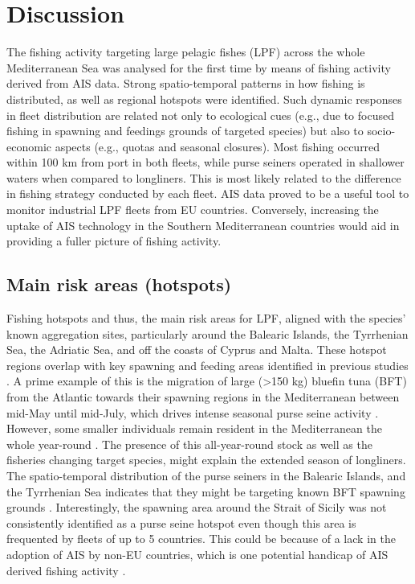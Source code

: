 \chapter{Discussion}
The fishing activity targeting large pelagic fishes (LPF) across the whole Mediterranean Sea was
analysed for the first time by means of fishing activity derived from AIS data. Strong
spatio-temporal patterns in how fishing is distributed, as well as regional hotspots were
identified. Such dynamic responses in fleet distribution are related not only to ecological cues
(e.g., due to focused fishing in spawning and feedings grounds of targeted species) but also to
socio-economic aspects (e.g., quotas and seasonal closures). Most fishing occurred within 100 km
from port in both fleets, while purse seiners operated in shallower waters when compared to
longliners. This is most likely related to the difference in fishing strategy conducted by each
fleet. AIS data proved to be a useful tool to monitor industrial LPF fleets from EU countries.
Conversely, increasing the uptake of AIS technology in the Southern Mediterranean countries would
aid in providing a fuller picture of fishing activity.

\section{Main risk areas (hotspots)}
Fishing hotspots and thus, the main risk areas for LPF, aligned with the species' known aggregation
sites, particularly around the Balearic Islands, the Tyrrhenian Sea, the Adriatic Sea, and off the
coasts of Cyprus and Malta. These hotspot regions overlap with key spawning and feeding areas
identified in previous studies \citep{medina_spawning,arocha_2007}. A prime example of this is the
migration of large (>150 kg) bluefin tuna (BFT) from the Atlantic towards their spawning regions in
the Mediterranean between mid-May until mid-July, which drives intense seasonal purse seine
activity \citep{bft_mig_med}. However, some smaller individuals remain resident in the
Mediterranean the whole year-round \citep{cermeno_15_tagging,heinisch_08}. The presence of this
all-year-round stock as well as the fisheries changing target species, might explain the extended
season of longliners. The spatio-temporal distribution of the purse seiners in the Balearic
Islands, and the Tyrrhenian Sea indicates that they might be targeting known BFT spawning grounds
\citep{medina_spawning}. Interestingly, the spawning area around the Strait of Sicily was not
consistently identified as a purse seine hotspot even though this area is frequented by fleets of
up to 5 countries. This could be because of a lack in the adoption of AIS by non-EU countries,
which is one potential handicap of AIS derived fishing activity
\citep{taconet2019global,paolo24satellite}.

